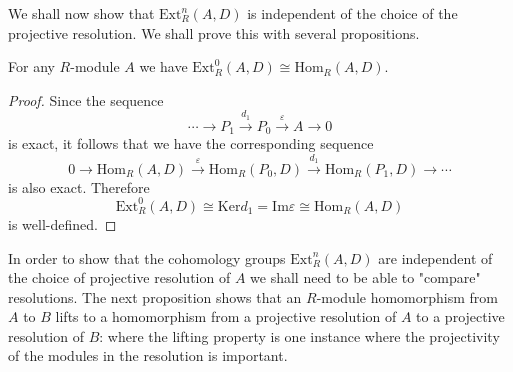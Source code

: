 We shall now show that $\mathrm{Ext}_R^n(A,D)$ is independent of the choice of the projective resolution. We shall prove this with several propositions.
\begin{proposition}
For any $R$-module $A$ we have $\mathrm{Ext}_R^0(A,D)\cong\mathrm{Hom}_R(A,D)$.
\end{proposition}
\begin{proof}
Since the sequence 
$$
\cdots \longrightarrow P_1\overset{d_1}{\longrightarrow}P_0\overset{\varepsilon}{\longrightarrow}A\longrightarrow 0
$$
is exact, it follows that we have the corresponding sequence 
$$
0\longrightarrow \mathrm{Hom}_R\left( A,D \right) \overset{\varepsilon}{\longrightarrow}\mathrm{Hom}_R\left( P_0,D \right) \overset{d_1}{\longrightarrow}\mathrm{Hom}_R\left( P_1,D \right) \longrightarrow \cdots 
$$
is also exact. Therefore 
$$
\mathrm{Ext}_{R}^{0}\left( A,D \right) \cong \mathrm{Ker}d_1=\mathrm{Im}\varepsilon \cong \mathrm{Hom}_R\left( A,D \right) 
$$
is well-defined.
\end{proof}
In order to show that the cohomology groups $\mathrm{Ext}_R^n(A,D)$ are independent of the choice of projective resolution of $A$ we shall need to be able to "compare" resolutions. The next proposition shows that an $R$-module homomorphism from $A$ to $B$ lifts to a homomorphism from a projective resolution of $A$ to a projective resolution of $B$: where the lifting property is one instance where the projectivity of the modules in the resolution is important.
